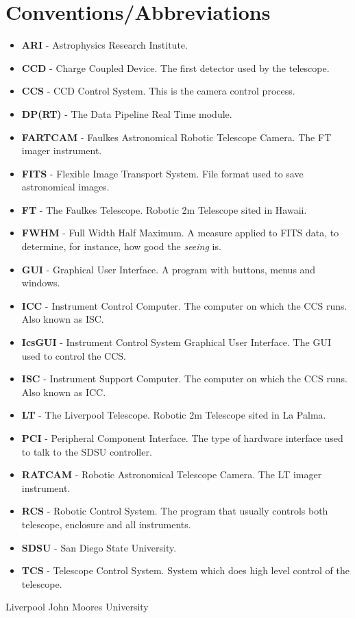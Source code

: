 \documentclass[10pt,a4paper]{article}
\begin{document}
\section{Conventions/Abbreviations}
\begin{itemize}
\item {\bf ARI} - Astrophysics Research Institute.
\item {\bf CCD} - Charge Coupled Device. The first detector used by the telescope.
\item {\bf CCS} - CCD Control System. This is the camera control process.
\item {\bf DP(RT)} - The Data Pipeline Real Time module.
\item {\bf FARTCAM} - Faulkes Astronomical Robotic Telescope Camera. The FT imager instrument.
\item {\bf FITS} - Flexible Image Transport System. File format used to save astronomical images.
\item {\bf FT} - The Faulkes Telescope. Robotic 2m Telescope sited in Hawaii.
\item {\bf FWHM} - Full Width Half Maximum. A measure applied to FITS data, to determine, for instance,
	how good the {\em seeing} is.
\item {\bf GUI} - Graphical User Interface. A program with buttons, menus and windows.
\item {\bf ICC} - Instrument Control Computer. The computer on which the CCS runs. Also known as ISC.
\item {\bf IcsGUI} - Instrument Control System Graphical User Interface. The GUI used to control the CCS.
\item {\bf ISC} - Instrument Support Computer. The computer on which the CCS runs. Also known as ICC.
\item {\bf LT} - The Liverpool Telescope. Robotic 2m Telescope sited in La Palma.
\item {\bf PCI} - Peripheral Component Interface. The type of hardware interface used to talk to the SDSU controller.
\item {\bf RATCAM} - Robotic Astronomical Telescope Camera. The LT imager instrument.
\item {\bf RCS} - Robotic Control System. The program that usually controls both telescope, enclosure and
	all instruments.
\item {\bf SDSU} - San Diego State University.
\item {\bf TCS} - Telescope Control System. System which does high level control of the telescope.
\end{itemize}
 
\begin{thebibliography}{99}

Liverpool John Moores University 

\end{thebibliography}
\end{document}
